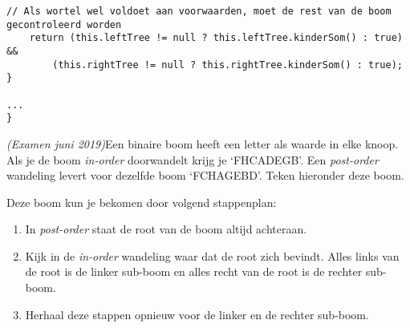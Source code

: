 \begin{oef}
\begin{opl}
\begin{lstlisting}[caption={kinderSom() methode}, label=kinderSom]
	// Als wortel wel voldoet aan voorwaarden, moet de rest van de boom gecontroleerd worden
	return (this.leftTree != null ? this.leftTree.kinderSom() : true) && 
		(this.rightTree != null ? this.rightTree.kinderSom() : true);
}

...
}
	\end{lstlisting}
\end{opl}
	
\end{oef}


\begin{oef}
\papier \emph{(Examen juni 2019)}Een binaire boom heeft een letter als waarde in elke knoop. Als je de boom \emph{in-order} doorwandelt krijg je ‘FHCADEGB’. Een \emph{post-order} wandeling levert voor dezelfde boom ‘FCHAGEBD’. Teken hieronder deze boom.
\begin{opl}

Deze boom kun je bekomen door volgend stappenplan:
\begin{enumerate}
	\item In \emph{post-order} staat de root van de boom altijd achteraan.
	\item Kijk in de \emph{in-order} wandeling waar dat de root zich bevindt. Alles links van de root is de linker sub-boom en alles recht van de root is de rechter sub-boom.
	\item Herhaal deze stappen opnieuw voor de linker en de rechter sub-boom.
\end{enumerate}


\end{opl}
\end{oef}
